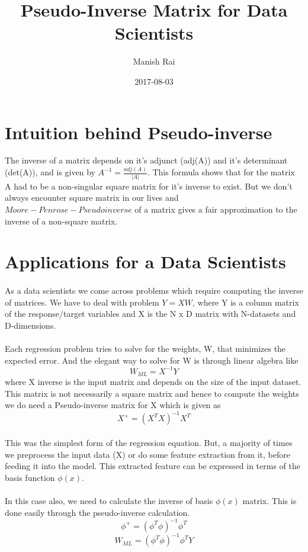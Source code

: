 \documentclass{article} %
\title{Pseudo-Inverse Matrix for Data Scientists}
\author{Manish Rai}
\date{2017-08-03}
\begin{document}
\maketitle%
\newpage %

\section{Intuition behind Pseudo-inverse}

The inverse of a matrix depends on it's adjunct (adj(A)) and it's determinant (det(A)), and is given by $A^{-1} = \frac{adj(A)}{|A|}$. This formula shows that for the matrix A had to be a non-singular square matrix for it's inverse to exist.
But we don't always encounter square matrix in our lives and $Moore-Penrose-Pseudoinverse$ of  a matrix gives a fair approximation to the inverse of a non-square matrix.

\section{Applications for a Data Scientists}
\paragraph{}
As a data scientists we come across problems which require computing the inverse of matrices.
We have to deal with problem $Y = XW$, where Y is a column matrix of the response/target variables and X is the N x D matrix with N-datasets and D-dimensions.
\paragraph{}
Each regression problem tries to solve for the weights, W, that minimizes the expected error. And the elegant way to solve for W is through linear algebra like
\begin{equation}
W_{ML} = X^{-1}Y
\end{equation}
where X inverse is the input matrix and depends on the size of the input dataset. This matrix is not necessarily a square matrix and hence to compute the weights we do need a Pseudo-inverse matrix for X which is given as
\begin{equation}
X^{+} = (X^{T}X)^{-1}X^{T}
\end{equation}
\paragraph{}
This was the simplest form of the regression equation. But, a majority of times we preprocess the input data (X) or do some feature extraction from it, before feeding it into the model.
This extracted feature can be expressed in terms of the basis function $\phi(x)$.
\paragraph{}
In this case also, we need to calculate the inverse of basis $\phi(x)$ matrix. This is done easily through the pseudo-inverse calculation.
\begin{equation}
\phi^{+} = (\phi^{T}\phi)^{-1}\phi^{T}
\end{equation}
\begin{equation}
W_{ML} = (\phi^{T}\phi)^{-1}\phi^{T} Y
\end{equation}
\end{document}

